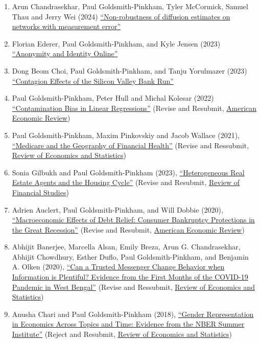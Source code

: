 \documentclass[letterpaper]{article}
\begin{document}
\begin{enumerate}
\item Arun Chandrasekhar, Paul Goldsmith-Pinkham, Tyler McCormick, Samuel Thau and Jerry Wei (2024) \href{https://paulgp.github.io/papers/diffusion_error_CGPMTW.pdf}{``Non-robustness of diffusion estimates on networks with measurement error''}
\item Florian Ederer, Paul Goldsmith-Pinkham, and Kyle Jensen (2023) \href{https://florianederer.github.io/ejmr.pdf}{``Anonymity and Identity Online''}
\item Dong Beom Choi, Paul Goldsmith-Pinkham, and Tanju Yorulmazer (2023) \href{https://arxiv.org/pdf/2308.06642.pdf}{``Contagion Effects of the Silicon Valley Bank Run''}
\item Paul Goldsmith-Pinkham, Peter Hull and Michal Kolesar (2022) \href{https://arxiv.org/abs/2106.05024}{``Contamination Bias in Linear Regressions''} (Revise and Resubmit, \ul{American Economic Review})
\item Paul Goldsmith-Pinkham, Maxim Pinkovskiy and Jacob Wallace (2021), \href{http://paulgp.github.io/papers/GPW_compressed.pdf}{``Medicare and the Geography of Financial Health''} (Revise and Ressubmit, \ul{Review of Economics and Statistics})
\item Sonia Gilbukh and Paul Goldsmith-Pinkham (2023), \href{http://paulgp.github.io/papers/Heterogeneous_Real_Estate_Agents_and_the_Housing_Cycle.pdf}{``Heterogeneous Real Estate Agents and the Housing Cycle''} (Revise and Resubmit, \ul{Review of Financial Studies})
\item Adrien Auclert, Paul Goldsmith-Pinkham, and Will Dobbie (2020), \href{http://paulgp.github.io/papers/Macroeconomic_Effects_of_Debt_Relief_Posting_342019.pdf}{``Macroeconomic Effects of Debt Relief: Consumer Bankruptcy Protections in the Great Recession''} (Revise and Resubmit, \ul{American Economic Review})
\item Abhijit Banerjee, Marcella Alsan, Emily Breza, Arun G. Chandrasekhar, Abhijit Chowdhury, Esther Duflo, Paul Goldsmith-Pinkham, and Benjamin A. Olken (2020), \href{https://economics.mit.edu/sites/default/files/2022-08/wb_manuscript_final.pdf}{``Can a Trusted Messenger Change Behavior when Information is Plentiful? Evidence from the First Months of the COVID-19 Pandemic in West Bengal''}  (Revise and Ressubmit, \ul{Review of Economics and Statistics})
\item Anusha Chari and  Paul Goldsmith-Pinkham (2018), \href{http://paulgp.github.io/papers/cgp_nbergender.pdf}{``Gender Representation in Economics Across Topics and Time: Evidence from the NBER Summer Institute''} (Reject and Resubmit, \ul{Review of Economics and Statistics})
\end{enumerate}
\end{document}
